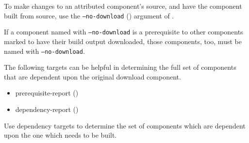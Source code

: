 \begin{enumerate}
  To make changes to an attributed component's source, and have the
  component built from source, use the \texttt{--no-download}
  () argument of \lmsbwcmd.

  If a component named with \texttt{--no-download} is a prerequisite
  to other components marked to have their build output downloaded,
  those components, too, must be named with \texttt{--no-download}.

  The following \lmsbwcmd targets can be helpful in determining the
  full set of components that are dependent upon the original download
  component.

  \begin{itemize}
  \item{prerequisite-report} ()
  \item{dependency-report} ()
  \end{itemize}
\end{enumerate}

Use dependency targets to determine the set of components which are
dependent upon the one which needs to be built.

